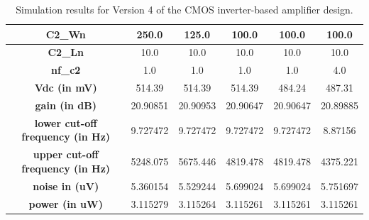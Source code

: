 \begin{table}[!ht]
\begin{adjustbox}{max width=\linewidth}
\begin{tabular}{|c|c|c|c|c|c|}
        \textbf{C2\_Wn} & 250.0 & 125.0 & 100.0 & 100.0 & 100.0 \\ \hline
        \textbf{C2\_Ln} & 10.0 & 10.0 & 10.0 & 10.0 & 10.0 \\ \hline
        \textbf{nf\_c2} & 1.0 & 1.0 & 1.0 & 1.0 & 4.0 \\ \hline
        \textbf{Vdc (in mV)} & 514.39 & 514.39 & 514.39 & 484.24 & 487.31 \\ \hline
        \textbf{gain (in dB)} & 20.90851 & 20.90953 & 20.90647 & 20.90647 & 20.89885 \\ \hline
        \textbf{lower cut-off frequency (in Hz)} & 9.727472 & 9.727472 & 9.727472 & 9.727472 & 8.87156 \\ \hline
        \textbf{upper cut-off frequency (in Hz)} & 5248.075 & 5675.446 & 4819.478 & 4819.478 & 4375.221 \\ \hline
        \textbf{noise in (uV)} & 5.360154 & 5.529244 & 5.699024 & 5.699024 & 5.751697 \\ \hline
        \textbf{power (in uW)} & 3.115279 & 3.115264 & 3.115261 & 3.115261 & 3.115261 \\ \hline
    \end{tabular}
    \end{adjustbox}
    \caption{Simulation results for Version 4 of the CMOS inverter-based amplifier design.}
    \label{tab:v4_sim_results}
\end{table}
